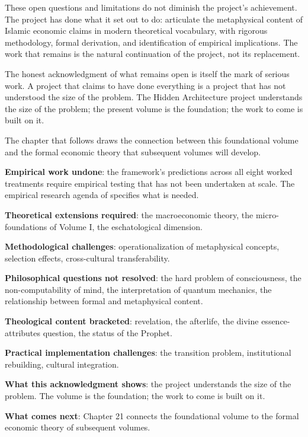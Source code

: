 These open questions and limitations do not diminish the
project's achievement. The project has done what it set out to
do: articulate the metaphysical content of Islamic economic
claims in modern theoretical vocabulary, with rigorous
methodology, formal derivation, and identification of empirical
implications. The work that remains is the natural continuation
of the project, not its replacement.

The honest acknowledgment of what remains open is itself the
mark of serious work. A project that claims to have done
everything is a project that has not understood the size of the
problem. The Hidden Architecture project understands the size of
the problem; the present volume is the foundation; the work to
come is built on it.

The chapter that follows draws the connection between this
foundational volume and the formal economic theory that
subsequent volumes will develop.

\begin{summarybox}
\textbf{Empirical work undone}: the framework's predictions across
all eight worked treatments require empirical testing that has
not been undertaken at scale. The empirical research agenda of
 specifies what is needed.

\textbf{Theoretical extensions required}: the macroeconomic
theory, the micro-foundations of Volume I, the eschatological
dimension.

\textbf{Methodological challenges}: operationalization of
metaphysical concepts, selection effects, cross-cultural
transferability.

\textbf{Philosophical questions not resolved}: the hard problem
of consciousness, the non-computability of mind, the
interpretation of quantum mechanics, the relationship between
formal and metaphysical content.

\textbf{Theological content bracketed}: revelation, the afterlife,
the divine essence-attributes question, the status of the
Prophet.

\textbf{Practical implementation challenges}: the transition
problem, institutional rebuilding, cultural integration.

\textbf{What this acknowledgment shows}: the project understands
the size of the problem. The volume is the foundation; the work
to come is built on it.

\textbf{What comes next}: Chapter 21 connects the foundational
volume to the formal economic theory of subsequent volumes.
\end{summarybox}

\cleardoublepage
